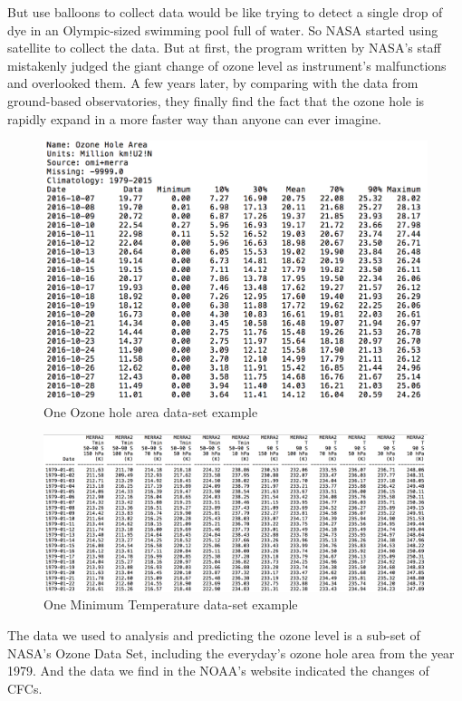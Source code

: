 \documentclass[12pt]{article}
\begin{document}
But use balloons to collect data would be like trying to detect a single drop of dye in an Olympic-sized swimming pool full of water. So NASA\cite{OzoneHoleWatch} started using satellite to collect the data. But at first, the program written by NASA's staff mistakenly judged the giant change of ozone level as instrument's malfunctions and overlooked them. A few years later, by comparing with the data from ground-based observatories, they finally find the fact that the ozone hole is rapidly expand in a more faster way than anyone can ever imagine.
\begin{center}
\begin{figure}[htpb]
\centering
\includegraphics[scale=0.6]{oz_area_data}
\caption{One Ozone hole area data-set example}\label{fig:data}
\end{figure}

\begin{figure}[htpb]
\centering
\includegraphics[scale=0.4]{T&T_data}
\caption{One Minimum Temperature data-set example}\label{fig:data}
\end{figure}
\end{center}
The data we used to analysis and predicting the ozone level is a sub-set of NASA's Ozone Data Set, including the everyday's ozone hole area from the year 1979. And the data we find in the NOAA's website indicated the changes of CFCs.
\end{document}
